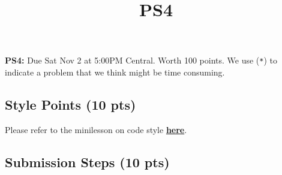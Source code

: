 \documentclass[
  letterpaper,
  DIV=11,
  numbers=noendperiod]{scrartcl}
\title{PS4}
\author{}
\date{}
\begin{document}
\maketitle



\textbf{PS4:} Due Sat Nov 2 at 5:00PM Central. Worth 100 points. We use
(\texttt{*}) to indicate a problem that we think might be time
consuming.

\subsection{Style Points (10 pts)}\label{style-points-10-pts}

Please refer to the minilesson on code style
\textbf{\href{https://uchicago.zoom.us/rec/share/pG_wQ-pHTQrJTmqNn4rcrw5V194M2H2s-2jdy8oVhWHkd_yZt9o162IWurpA-fxU.BIQlSgZLRYctvzp-}{here}}.

\subsection{Submission Steps (10 pts)}\label{submission-steps-10-pts}
\end{document}
